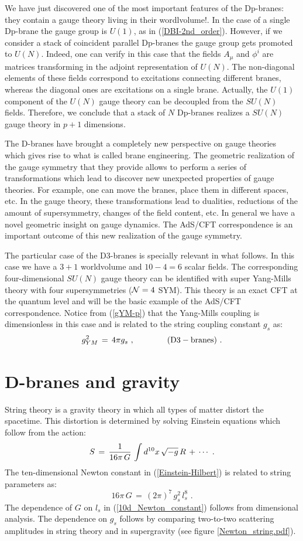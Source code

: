 \documentclass[12pt,notitlepage]{article}
\newcommand{\beq}{\begin{equation}}
\newcommand{\eeq}{\end{equation}}
\begin{document}
We have just discovered one of the most important features of the Dp-branes: they contain a gauge theory living in their wordlvolume!. In the case of a single Dp-brane the gauge group is $U(1)$, as in (\ref{DBI-2nd_order}).  However, if we consider a stack of coincident parallel Dp-branes the gauge group gets promoted to $U(N)$. Indeed, one can verify in this case that the fields $A_{\mu}$ and $\phi^i$ are matrices transforming in the adjoint representation of $U(N)$. The non-diagonal elements of these fields correspond to excitations connecting different branes, whereas the diagonal ones are excitations on a single brane. Actually, the $U(1)$ component of the $U(N)$ gauge theory can be decoupled from the $SU(N)$ fields. Therefore, we conclude that a stack of  $N$ Dp-branes realizes a $SU(N)$ gauge theory in $p+1$ dimensions. 


The D-branes have brought a completely new perspective on gauge theories which gives rise to what is called brane engineering. The geometric realization of the gauge symmetry that they  provide allows to perform a series of transformations which lead to discover new unexpected  properties of gauge theories. For example, 
one can move the branes, place them in different spaces, etc. In the gauge theory, these transformations lead to dualities, reductions of the amount of supersymmetry, changes of  the field content, etc. In general we have a novel geometric insight on gauge dynamics. The AdS/CFT correspondence is an important outcome of this new realization of the gauge symmetry. 


The particular case of the D3-branes is specially relevant in what follows. In this case we have a $3+1$ worldvolume and $10-4=6$ scalar fields. The corresponding four-dimensional $SU(N)$ gauge theory can be identified with super Yang-Mills theory with four supersymmetries (${\cal N}=4$ SYM). This theory is an exact CFT at the quantum level  and will be the basic example of the AdS/CFT correspondence. Notice from (\ref{gYM-p}) that the Yang-Mills coupling is dimensionless in this case and is related to the string coupling constant $g_s$ as:
\beq
g^2_{YM}\,=\,4\pi g_s\,\,,
\qquad\qquad
({\rm D3-branes})\,\,.
\label{gYM-p3}
\eeq



\section{D-branes and gravity}

String theory is a gravity theory in which all types of matter distort the spacetime. This distortion is determined by  solving Einstein equations which follow from the action:
\beq
S\,=\,{1\over 16\pi\, G}\,\int d^{10} x\,\sqrt{-g}\, R\,+\,\cdots\,\,.
\label{Einstein-Hilbert}
\eeq
The ten-dimensional Newton constant  in (\ref{Einstein-Hilbert}) is related to string parameters as:
\beq
16\pi\, G\,=\,(2\pi)^7\,g_s^2\,l_s^8\,\,.
\label{10d_Newton_constant}
\eeq
The dependence of $G$ on $l_s$ in (\ref{10d_Newton_constant})  follows from dimensional analysis. The dependence on $g_s$ follows by comparing two-to-two scattering amplitudes in string theory and in supergravity (see figure \ref{Newton_string.pdf}). 
\end{document}
